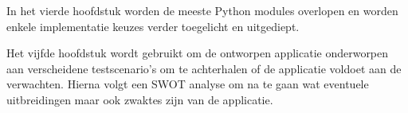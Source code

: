 In het vierde hoofdstuk worden de meeste Python modules overlopen en worden enkele implementatie keuzes verder toegelicht en uitgediept.

Het vijfde hoofdstuk wordt gebruikt om de ontworpen applicatie onderworpen aan verscheidene testscenario's om te achterhalen of de applicatie voldoet aan de verwachten.
Hierna volgt een SWOT analyse om na te gaan wat eventuele uitbreidingen maar ook zwaktes zijn van de applicatie.

